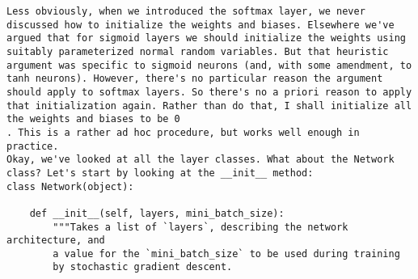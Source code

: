 \begin{lstlisting}
Less obviously, when we introduced the softmax layer, we never discussed how to initialize the weights and biases. Elsewhere we've argued that for sigmoid layers we should initialize the weights using suitably parameterized normal random variables. But that heuristic argument was specific to sigmoid neurons (and, with some amendment, to tanh neurons). However, there's no particular reason the argument should apply to softmax layers. So there's no a priori reason to apply that initialization again. Rather than do that, I shall initialize all the weights and biases to be 0
. This is a rather ad hoc procedure, but works well enough in practice.
Okay, we've looked at all the layer classes. What about the Network class? Let's start by looking at the __init__ method:
class Network(object):
    
    def __init__(self, layers, mini_batch_size):
        """Takes a list of `layers`, describing the network architecture, and
        a value for the `mini_batch_size` to be used during training
        by stochastic gradient descent.


\end{lstlisting}
